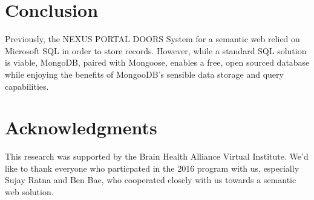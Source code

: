 \documentclass[10pt,twocolumn,twoside]{article}
\begin{document}
\section*{Conclusion}
\label{secConclusion}
	Previously, the NEXUS PORTAL DOORS System for a semantic web relied on Microsoft SQL in order to store records. However, while a standard SQL solution is viable, MongoDB, paired with Mongoose, enables a free, open sourced database while enjoying the benefits of MongooDB's sensible data storage and query capabilities. 


\section*{Acknowledgments}
This research was supported by the Brain Health Alliance Virtual Institute. We'd like to thank everyone who particpated in the 2016 program with us, especially Sujay Ratna and Ben Bae, who cooperated closely with us towards a semantic web solution. 
\end{document}
